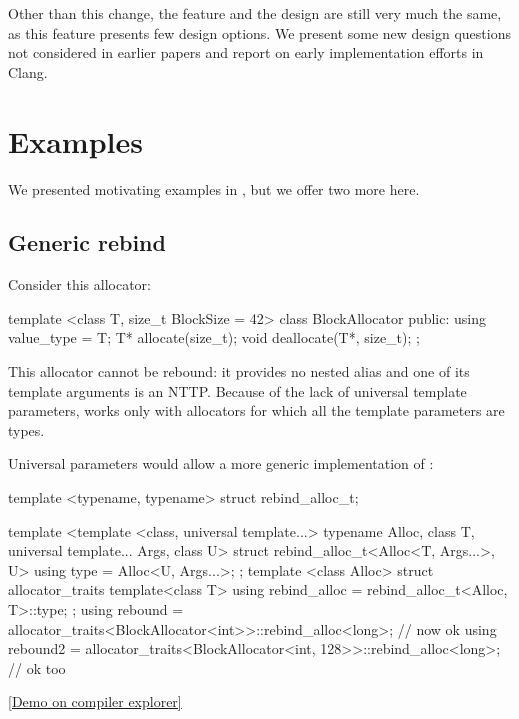 \documentclass{wg21}
\begin{document}
Other than this change, the feature and the design are still very much the same, as this feature presents few design options.
We present some new design questions not considered in earlier papers and report on early implementation efforts in Clang.


\section{Examples}

We presented motivating examples in , but we offer two more here.

\subsection{Generic rebind}

Consider this allocator:

\begin{colorblock}
template <class T, size_t BlockSize = 42>
class BlockAllocator {
    public:
    using value_type = T;
    T* allocate(size_t);
    void deallocate(T*, size_t);
};
\end{colorblock}


This allocator cannot be rebound: it provides no  nested alias and one of its template arguments is an NTTP.
Because of the lack of universal template parameters,  works only with allocators for which all the template parameters are types.

Universal parameters would allow a more generic implementation of :


\begin{colorblock}
template <typename, typename>
struct rebind_alloc_t;

template <template <class, universal template...> typename Alloc, class T, universal template... Args, class U>
struct rebind_alloc_t<Alloc<T, Args...>, U> {
    using type = Alloc<U, Args...>;
};
template <class Alloc>
struct allocator_traits {
    template<class T>
    using rebind_alloc = rebind_alloc_t<Alloc, T>::type;
};
using rebound = allocator_traits<BlockAllocator<int>>::rebind_alloc<long>; // now ok
using rebound2 = allocator_traits<BlockAllocator<int, 128>>::rebind_alloc<long>; // ok too
\end{colorblock}

\href{https://gcc.godbolt.org/z/z7n978vdv}{[Demo on compiler explorer]}

\subsection{}
\end{document}

